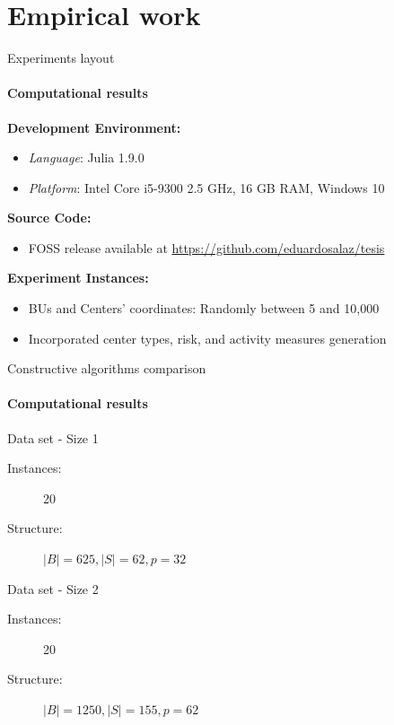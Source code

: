 \documentclass{beamer}
\begin{document}
\section{Empirical work}

\begin{frame}{Experiments layout}
    \framesubtitle{Computational results}

    \textbf{Development Environment:}
    \begin{itemize}
        \item \textit{Language}: Julia 1.9.0
        \item \textit{Platform}: Intel Core i5-9300 2.5 GHz, 16 GB RAM, Windows 10
    \end{itemize}

    \textbf{Source Code:}
    \begin{itemize}
        \item FOSS release available at \url{https://github.com/eduardosalaz/tesis}
    \end{itemize}

    \textbf{Experiment Instances:}
    \begin{itemize}
        \item BUs and Centers' coordinates: Randomly between 5 and 10,000
        \item Incorporated center types, risk, and activity measures generation
    \end{itemize}

\end{frame}
\begin{frame}{Constructive algorithms comparison}
    \framesubtitle{Computational results}

    \begin{block}{Data set - Size 1}
        \begin{description}
            \item[Instances:] 20
            \item[Structure:] $\lvert B \rvert = 625, \lvert S \rvert = 62, p = 32$
        \end{description}
    \end{block}

    \begin{block}{Data set - Size 2}
        \begin{description}
            \item[Instances:] 20
            \item[Structure:] $\lvert B \rvert = 1250, \lvert S \rvert = 155, p = 62$
        \end{description}
    \end{block}

\end{frame}
\end{document}
